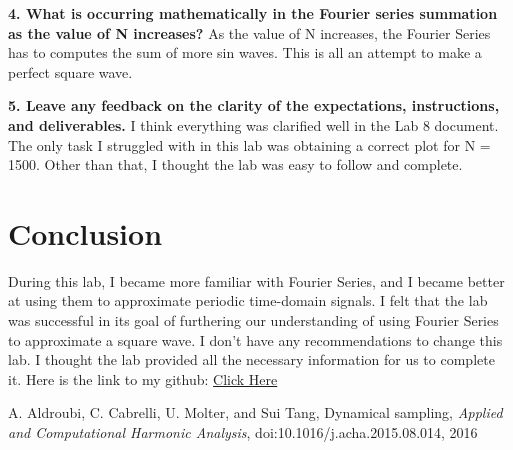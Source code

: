 \documentclass[12pt]{report}
\begin{document}
\textbf{4. What is occurring mathematically in the Fourier series summation as the value of N increases?}
{As the value of N increases, the Fourier Series has to computes the sum of more sin waves. This is all an attempt to make a perfect square wave. }

\textbf{5. Leave any feedback on the clarity of the expectations, instructions, and deliverables.}
{I think everything was clarified well in the Lab 8 document. The only task I struggled with in this lab was obtaining a correct plot for N = 1500. Other than that, I thought the lab was easy to follow and complete.}



\section{Conclusion}

During this lab, I became more familiar with Fourier Series, and I became better at using them to approximate periodic time-domain signals. I felt that the lab was successful in its goal of furthering our understanding of using Fourier Series to approximate a square wave. I don't have any recommendations to change this lab. I thought the lab provided all the necessary information for us to complete it. Here is the link to my github: \href{https://github.com/JMac1999}{Click Here}

\newpage


\begin{thebibliography}{111}

A. Aldroubi, C. Cabrelli, U. Molter, and Sui Tang,
Dynamical sampling, 
{\it  Applied and Computational Harmonic Analysis}, doi:10.1016/j.acha.2015.08.014, 2016


\end{thebibliography}
\end{document}
